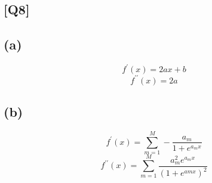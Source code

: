 \documentclass[12pt, a4 paper]{article}
\begin{document}
    \begin{framed}
        \section{[Q8]}
        \subsection{(a)}
        $$
        f^{\prime}(x) = 2ax + b
        $$
        $$
        f^{\prime \prime} (x) = 2a  
        $$
        \subsection{(b)}
        $$
        f^{\prime}(x) = \sum\limits_{m=1}^{M} - \frac{a_{m}}{1+e^{a_{m}x}}
        $$
        $$
        f^{\prime \prime}(x) = \sum\limits_{m=1}^{M} \frac{a_{m}^{2}e^{a_{m}x}}{(1+e^{a{m}x})^2}
        $$
    \end{framed}
\end{document}
